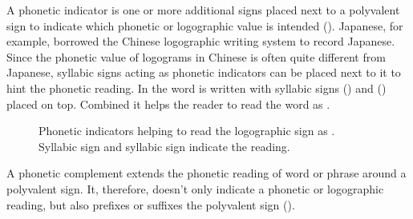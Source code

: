 \documentclass[../main.tex]{subfiles}
\begin{document}
A phonetic indicator is one or more additional signs placed next to a polyvalent sign to
indicate which phonetic or logographic value is intended (\cite[56-57]{whittaker2009}).
Japanese, for example, borrowed the Chinese logographic writing system to record Japanese.
Since the phonetic value of logograms in Chinese is often quite different from Japanese, 
syllabic signs acting as phonetic indicators can be placed next to it to hint the phonetic reading.
In  the word  is written with syllabic signs 
 () and  () 
placed on top.
Combined it helps the reader to read the word as .
\begin{figure}[h!]
    \centering
    \caption[Japanese phonetic indicators]{Phonetic indicators helping to read the 
             logographic sign  as .\\
            Syllabic sign   and 
            syllabic sign   indicate the reading.}
\end{figure}
A phonetic complement extends the phonetic reading of word or phrase around a polyvalent sign.
It, therefore, doesn't only indicate a phonetic or logographic reading, but also prefixes or
suffixes the polyvalent sign (\cite[56-57]{whittaker2009}).
\end{document}
